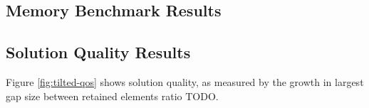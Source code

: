 

\subsection{Memory Benchmark Results}




\subsection{Solution Quality Results}




Figure \ref{fig:tilted-qos} shows solution quality, as measured by the growth in largest gap size between retained elements ratio TODO.
